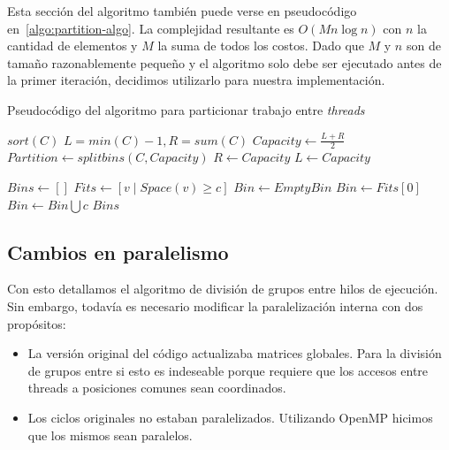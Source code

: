 Esta secci\'on del algoritmo tambi\'en puede verse en pseudoc\'odigo en~\ref{algo:partition-algo}.
La complejidad resultante es $O(M n \log n)$ con $n$ la cantidad de elementos y $M$ la suma
de todos los costos. Dado que $M$ y $n$ son de tama\~no razonablemente peque\~no y el algoritmo
solo debe ser ejecutado antes de la primer iteraci\'on, decidimos utilizarlo para
nuestra implementaci\'on.

\begin{algorithm}[H]
    \caption{Pseudoc\'odigo del algoritmo para particionar trabajo entre \textit{threads}}
    \label{algo:partition-algo}
    \begin{algorithmic}
            \State $sort(C)$
            \State $L = min(C)-1, R = sum(C)$
                \Comment{Invariante: $(L, \dots, R]$ contiene la capacidad maxima.}
                \State $Capacity \gets \frac{L+R}{2}$
                \State $Partition \gets splitbins(C,Capacity)$
                    \State $R \gets Capacity$
                \Else
                    \State $L \gets Capacity$
                \EndIf
            \EndWhile

            \State {}
        \EndFunction

            \State $Bins \gets []$
                \State $Fits \gets [v \mid Space(v) \geq c]$
                    \State $Bin \gets EmptyBin$
                \Else
                    \State $Bin \gets Fits[0]$
                \EndIf 
                \State $Bin \gets Bin \bigcup c$
            \EndFor
            \State \Return $Bins$
        \EndFunction
    \end{algorithmic}
\end{algorithm}

\subsection{Cambios en paralelismo}

Con esto detallamos el algoritmo de divisi\'on de grupos entre hilos de ejecuci\'on.
Sin embargo, todav\'ia es necesario modificar la paralelizaci\'on interna con dos
prop\'ositos:

\begin{itemize}
    \item La versi\'on original del c\'odigo actualizaba matrices globales. Para
    la divisi\'on de grupos entre si esto es indeseable porque requiere que los
    accesos entre threads a posiciones comunes sean coordinados. 
    \item Los ciclos originales no estaban paralelizados. Utilizando OpenMP 
    hicimos que los mismos sean paralelos.
\end{itemize}

